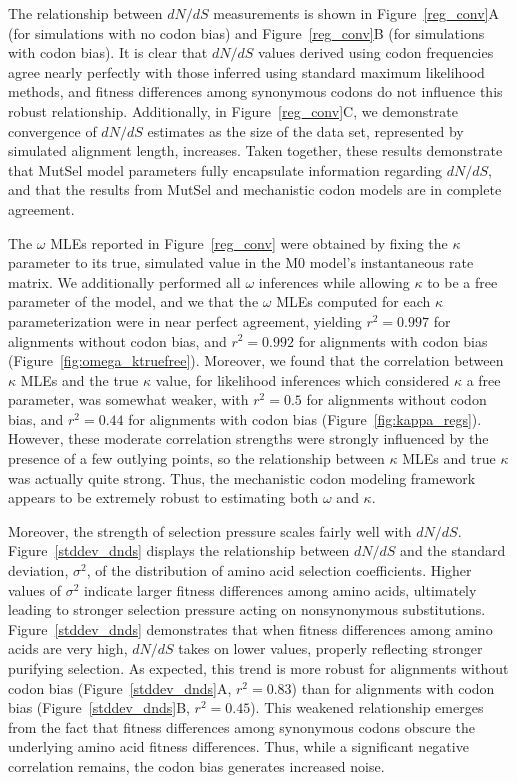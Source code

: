 \documentclass{pnastwo}
\begin{document}
The relationship between $dN/dS$ measurements is shown in Figure~\ref{reg_conv}A (for simulations with no codon bias) and Figure~\ref{reg_conv}B (for simulations with codon bias). It is clear that $dN/dS$ values derived using codon frequencies agree nearly perfectly with those inferred using standard maximum likelihood methods, and fitness differences among synonymous codons do not influence this robust relationship. Additionally, in Figure~\ref{reg_conv}C, we demonstrate convergence of $dN/dS$ estimates as the size of the data set, represented by simulated alignment length, increases. Taken together, these results demonstrate that MutSel model parameters fully encapsulate information regarding $dN/dS$, and that the results from MutSel and mechanistic codon models are in complete agreement.

The $\omega$ MLEs reported in Figure~\ref{reg_conv} were obtained by fixing the $\kappa$ parameter to its true, simulated value in the M0 model's instantaneous rate matrix. We additionally performed all $\omega$ inferences while allowing $\kappa$ to be a free parameter of the model, and we that the $\omega$ MLEs computed for each $\kappa$ parameterization were in near perfect agreement, yielding $r^2=0.997$ for alignments without codon bias, and $r^2=0.992$ for alignments with codon bias (Figure~\ref{fig:omega_ktruefree}). Moreover, we found that the correlation between $\kappa$ MLEs and the true $\kappa$ value, for likelihood inferences which considered $\kappa$ a free parameter, was somewhat weaker, with $r^2=0.5$ for alignments without codon bias, and $r^2=0.44$ for alignments with codon bias (Figure~\ref{fig:kappa_regs}). However, these moderate correlation strengths were strongly influenced by the presence of a few outlying points, so the relationship between $\kappa$ MLEs and true $\kappa$ was actually quite strong. Thus, the mechanistic codon modeling framework appears to be extremely robust to estimating both $\omega$ and $\kappa$.  

Moreover, the strength of selection pressure scales fairly well with $dN/dS$. Figure~\ref{stddev_dnds} displays the relationship between $dN/dS$ and the standard deviation, $\sigma^2$, of the distribution of amino acid selection coefficients. Higher values of $\sigma^2$ indicate larger fitness differences among amino acids, ultimately leading to stronger selection pressure acting on nonsynonymous substitutions. Figure~\ref{stddev_dnds} demonstrates that when fitness differences among amino acids are very high, $dN/dS$ takes on lower values, properly reflecting stronger purifying selection. As expected, this trend is more robust for alignments without codon bias (Figure~\ref{stddev_dnds}A, $r^2 = 0.83$) than for alignments with codon bias (Figure~\ref{stddev_dnds}B, $r^2 = 0.45$). This weakened relationship emerges from the fact that fitness differences among synonymous codons obscure the underlying amino acid fitness differences. Thus, while a significant negative correlation remains, the codon bias generates increased noise.
\end{document}
